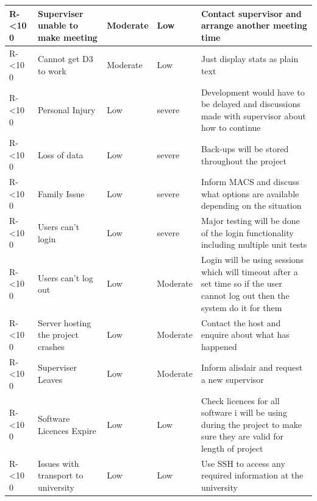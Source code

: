 \documentclass[12pt]{article}  %
\newcommand{\rid}[1]{\centering #1-\ifnum\value{requirement}<10 0\fi\arabic{requirement} \stepcounter{requirement}}
\begin{document}
\begin{spacing}{1.5}
\begin{longtable}{|p{}|p{}|p{}|p{}|p{}|}
\rid{R} & Superviser unable to make meeting & Moderate & Low & Contact supervisor and arrange another meeting time \\ \hline

\rid{R} & Cannot get D3 to work & Moderate & Low & Just display stats as plain text\\ \hline



\rid{R} & Personal Injury & Low & severe & Development would have to be delayed and discussions made with supervisor about how to continue\\ \hline

\rid{R} & Loss of data & Low & severe & Back-ups will be stored throughout the project\\
\hline

\rid{R} & Family Issue & Low & severe  & Inform MACS and discuss what options are available depending on the situation \\ \hline

\rid{R} & Users can't login & Low & severe & Major testing will be done of the login functionality including multiple unit tests\\ \hline

\rid{R} & Users can't log out & Low & Moderate & Login will be using sessions which will timeout after a set time so if the user cannot log out then the system do it for them\\ \hline

\rid{R} & Server hosting the project crashes & Low & Moderate & Contact the host and enquire about what has happened\\ \hline

\rid{R} & Superviser Leaves & Low & Moderate & Inform alisdair and request a new supervisor\\ \hline

\rid{R} & Software Licences Expire & Low & Low & Check licences for all software i will be using during the project to make sure they are valid for length of project\\ \hline

\rid{R} & Issues with transport to university  & Low & Low & Use SSH to access any required information at the university  \\ \hline

\end{longtable}
\end{spacing}
\end{document}

